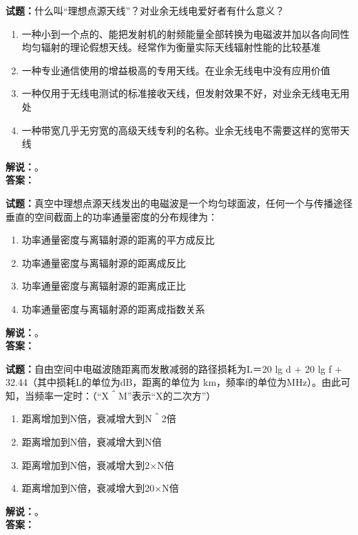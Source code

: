 \documentclass{ctexbook}
\begin{document}
\vspace{\baselineskip}

\noindent\textbf{试题：}什么叫“理想点源天线”？对业余无线电爱好者有什么意义？
\begin{enumerate}[leftmargin=3em]
  \item 一种小到一个点的、能把发射机的射频能量全部转换为电磁波并加以各向同性均匀辐射的理论假想天线。经常作为衡量实际天线辐射性能的比较基准
  \item 一种专业通信使用的增益极高的专用天线。在业余无线电中没有应用价值
  \item 一种仅用于无线电测试的标准接收天线，但发射效果不好，对业余无线电无用处
  \item 一种带宽几乎无穷宽的高级天线专利的名称。业余无线电不需要这样的宽带天线
\end{enumerate}
\noindent\textbf{解说：}\textbf{}。\\\noindent\textbf{答案：}

\vspace{\baselineskip}

\noindent\textbf{试题：}真空中理想点源天线发出的电磁波是一个均匀球面波，任何一个与传播途径垂直的空间截面上的功率通量密度的分布规律为：
\begin{enumerate}[leftmargin=3em]
  \item 功率通量密度与离辐射源的距离的平方成反比
  \item 功率通量密度与离辐射源的距离成反比
  \item 功率通量密度与离辐射源的距离成正比
  \item 功率通量密度与离辐射源的距离成指数关系
\end{enumerate}
\noindent\textbf{解说：}\textbf{}。\\\noindent\textbf{答案：}

\vspace{\baselineskip}

\noindent\textbf{试题：}自由空间中电磁波随距离而发散减弱的路径损耗为L＝20 lg d + 20 lg f + 32.44（其中损耗L的单位为dB，距离的单位为 km，频率f的单位为\unit{\MHz}）。由此可知，当频率一定时：（“X＾M”表示“X的二次方”）
\begin{enumerate}[leftmargin=3em]
  \item 距离增加到N倍，衰减增大到N＾2倍
  \item 距离增加到N倍，衰减增大到N倍
  \item 距离增加到N倍，衰减增大到2×N倍
  \item 距离增加到N倍，衰减增大到20×N倍
\end{enumerate}
\noindent\textbf{解说：}\textbf{}。\\\noindent\textbf{答案：}
\end{document}
